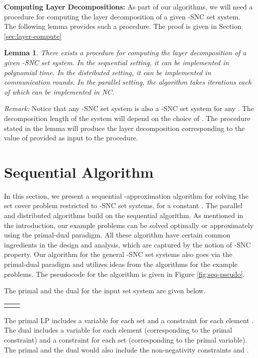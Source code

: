 \documentclass[11pt]{article}
\newtheorem{lemma}[theorem]{\bf Lemma}
\begin{document}
{\bf Computing Layer Decompositions: }
As part of our algorithms, we will need a procedure for computing the layer decomposition of a 
given -SNC set system. The following lemma provides such a procedure. 
The proof is given in Section \ref{sec:layer-compute}

\begin{lemma}
\label{lem:TTT}
There exists a procedure for computing the layer decomposition of a given -SNC set system.
In the sequential setting, it can be implemented in polynomial time.
In the distributed setting, it can be implemented in  communication rounds.
In the parallel setting, the algorithm takes  iterations each of which can be implemented in NC.
\end{lemma}

{\it Remark: }Notice that any -SNC set system is also a -SNC set system
for any . The decomposition length of the system will depend on the choice of .
The procedure stated in the lemma will produce the layer decomposition corresponding to the value of  provided 
as input to the procedure.

\section{Sequential Algorithm}
In this section, we present a sequential -approximation algorithm for solving the set cover problem
restricted to -SNC set systems, for a constant .
The parallel and distributed algorithms build on the sequential algorithm.
As mentioned in the introduction, our example problems
can be solved optimally or approximately using the primal-dual paradigm. 
All these algorithm have certain common ingredients in the design and analysis,
which are captured by the notion of -SNC property.
Our algorithm for the general -SNC set systems 
also goes via the primal-dual paradigm and utilizes ideas from the algorithms for the example problems.
The pseudocode for the algorithm is given in Figure \ref{fig:seq-pseudo}.

The primal and the dual for the input set system  are given below.

\begin{tabular}{p{3in}p{3in}}

&

\end{tabular}

The primal LP includes a variable  for each set 
and a constraint for each element .
The dual includes a variable  for each element  (corresponding to the primal constraint)
and a constraint for each set  (corresponding to the primal variable).
The primal and the dual would also include the non-negativity constraints  and .
\end{document}
